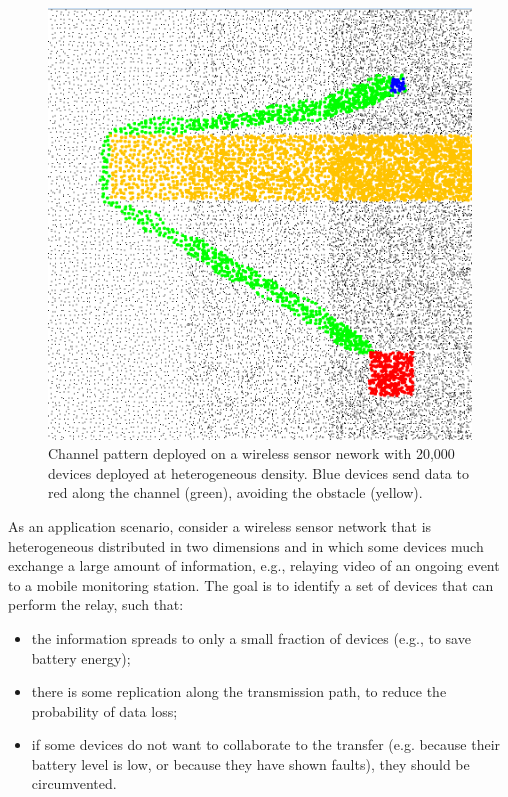 \documentclass[12pt,a4paper,twoside,openright]{book}
\begin{document}
\begin{figure}
\centering
\includegraphics[width=\columnwidth]{img/shots-6-channel}
\caption[Channel pattern in a WSN]{Channel pattern deployed on a wireless sensor nework with 20,000 devices deployed at heterogeneous density.  Blue devices send data to red along the channel (green), avoiding the obstacle (yellow).}
\label{f:wsn}
\end{figure}

As an application scenario, consider a wireless sensor network that is heterogeneous distributed in two dimensions and in which some devices much exchange a large amount of information, e.g., relaying video of an ongoing event to a mobile monitoring station.
%
The goal is to identify a set of devices that can perform the relay, such that:
\begin{itemize}
\item the information spreads to only a small fraction of devices (e.g., to save battery energy);
 \item there is some replication along the transmission path, to reduce the probability of data loss;
 \item if some devices do not want to collaborate to the transfer (e.g. because their battery level is low, or because they have shown faults), they should be circumvented.
\end{itemize}
\end{document}
